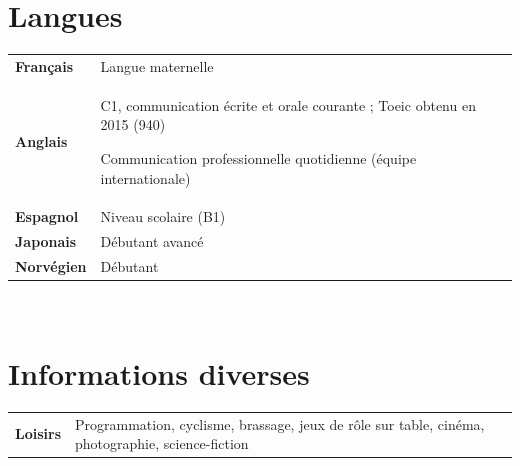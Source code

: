 \documentclass[10pt]{article}
\newlength{\annee}
\newlength{\texte}
\begin{document}
\section{Langues}

\begin{tabular}{@{}p{\annee}p{\texte}@{}}
	\bf Français		& Langue maternelle \\
	\bf Anglais 	& C1, communication écrite et orale courante ; {\sc Toeic} obtenu en 2015 (940) \par
		Communication professionnelle quotidienne (équipe internationale) \\
	\bf Espagnol 	& Niveau scolaire (B1) \\
	\bf Japonais 	& Débutant avancé \\
	\bf Norvégien 	& Débutant \\
\end{tabular}


~\\[0.2cm]
\section{Informations diverses}

\begin{tabular}{@{}p{\annee}p{\texte}@{}}
	\bf Loisirs &
    	Programmation, cyclisme, brassage, jeux de rôle sur table, cinéma, photographie, science-fiction
\end{tabular}

\vfill
{}
\end{document}
